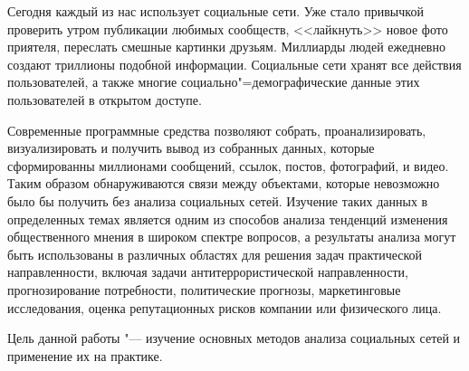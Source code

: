 Сегодня каждый из нас использует социальные сети. Уже стало привычкой проверить утром публикации любимых сообществ, <<лайкнуть>> новое фото приятеля, переслать смешные картинки друзьям. Миллиарды людей ежедневно создают триллионы подобной информации. Социальные сети хранят все действия пользователей, а также многие социально"=демографические данные этих пользователей в открытом доступе. 

Современные программные средства позволяют собрать, проанализировать, визуализировать и получить вывод из собранных данных, которые сформированны миллионами сообщений, ссылок, постов, фотографий, и видео. Таким образом обнаруживаются связи между объектами, которые невозможно было бы получить без анализа социальных сетей. Изучение таких данных в определенных темах является одним из способов анализа тенденций изменения общественного
мнения в широком спектре вопросов, а результаты
анализа могут быть использованы в различных областях для решения задач практической направленности, включая задачи антитеррористической
направленности, прогнозирование потребности,
политические прогнозы, маркетинговые исследования, оценка репутационных рисков компании
или физического лица\cite{Tomsk_research}.

Цель данной работы "--- изучение основных методов анализа социальных сетей и применение их на практике.
